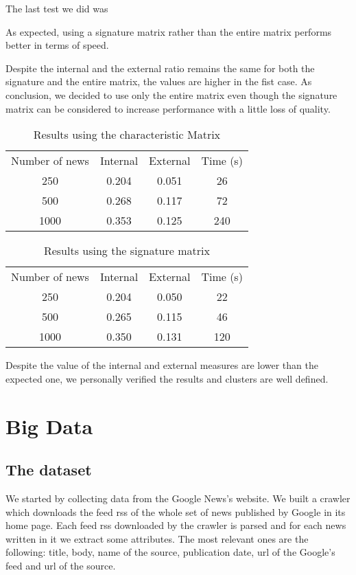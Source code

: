\documentclass{acm_proc_article-sp}
\begin{document}

The last test we did was 

As expected, using a signature matrix rather than the entire matrix performs better in terms of speed.

Despite the internal and the external ratio remains the same for both the signature and the entire matrix, the values are higher in the fist case. As conclusion, we decided to use only the entire matrix even though the signature matrix can be considered to increase performance with a little loss of quality.

\begin{table}[!h]
\centering
\label{table:matrix}
\begin{tabular}{cccc}
Number of news & Internal & External & Time (s) \\
250            & 0.204    & 0.051    & 26       \\
500            & 0.268    & 0.117    & 72       \\
1000           & 0.353    & 0.125    & 240      \\
\end{tabular}
\caption{Results using the characteristic Matrix}
\end{table}

\begin{table}[!h]
\centering
\label{table:sigmatrix}
\begin{tabular}{cccc}
Number of news & Internal & External & Time (s) \\
250            & 0.204    & 0.050    & 22       \\
500            & 0.265    & 0.115    & 46       \\
1000           & 0.350    & 0.131    & 120 
\end{tabular}
\caption{Results using the signature matrix}
\end{table}

Despite the value of the internal and external measures are lower than the expected one, we personally verified the results and clusters are well defined.

\section{Big Data}
\vspace{2mm}

\subsection{The dataset}
\vspace{2mm}
We started by collecting data from the Google News's website. We built a crawler which downloads the feed rss of the whole set of news published by Google in its home page.
Each feed rss downloaded by the crawler is parsed and for each news written in it we extract some attributes. The most relevant ones are the following: title, body, name of the source, publication date, url of the Google's feed and url of the source.
\end{document}
